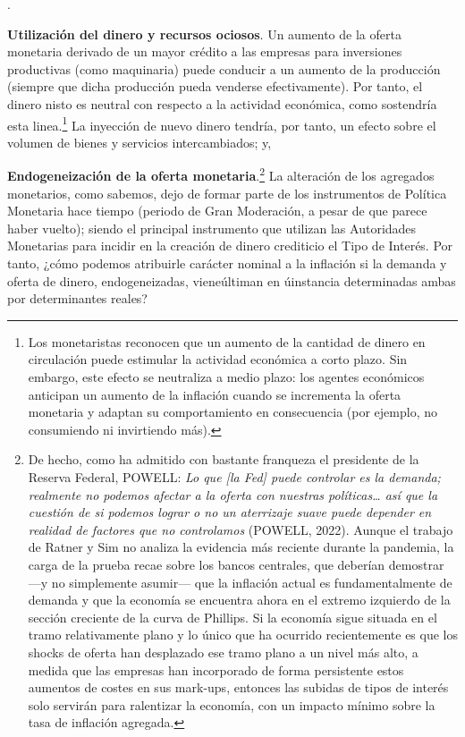 \documentclass[10pt,a4paper]{article}
\newcounter{numitem}
\newenvironment{lnum}
      {\begin{list}{\arabic{numitem}.}{%
          \usecounter{numitem}%
          \setlength{\leftmargin}{1cm}%
          \setlength{\parskip}{3pt}%
          \setlength{\itemsep}{0pt}%
          \setlength{\parsep}{0pt}%
      }}
      {\end{list}}
\begin{document}
\begin{lnum}
    \item \textbf{Utilización del dinero y recursos ociosos}. Un aumento de la oferta monetaria derivado de un mayor crédito a las empresas para inversiones productivas (como maquinaria) puede conducir a un aumento de la producción (siempre que dicha producción pueda venderse efectivamente). Por tanto, el dinero nisto es neutral con respecto a la actividad económica, como sostendría esta linea.\footnote{%
        Los monetaristas reconocen que un aumento de la cantidad de dinero en circulación puede estimular la actividad económica a corto plazo. Sin embargo, este efecto se neutraliza a medio plazo: los agentes económicos anticipan un aumento de la inflación cuando se incrementa la oferta monetaria y adaptan su comportamiento en consecuencia (por ejemplo, no consumiendo ni invirtiendo más).
    } La inyección de nuevo dinero tendría, por tanto, un efecto sobre el volumen de bienes y servicios intercambiados; y,
    \item \textbf{Endogeneización de la oferta monetaria}.\footnote{
    De hecho, como ha admitido con bastante franqueza el presidente de la Reserva Federal, POWELL: \textit{Lo que [la Fed] puede controlar es la demanda; realmente no podemos afectar a la oferta con nuestras políticas… así que la cuestión de si podemos lograr o no un aterrizaje suave puede depender en realidad de factores que no controlamos} (POWELL, 2022). Aunque el trabajo de Ratner y Sim no analiza la evidencia más reciente durante la pandemia, la carga de la prueba recae sobre los bancos centrales, que deberían demostrar —y no simplemente asumir— que la inflación actual es fundamentalmente de demanda y que la economía se encuentra ahora en el extremo izquierdo de la sección creciente de la curva de Phillips. Si la economía sigue situada en el tramo relativamente plano y lo único que ha ocurrido recientemente es que los shocks de oferta han desplazado ese tramo plano a un nivel más alto, a medida que las empresas han incorporado de forma persistente estos aumentos de costes en sus mark-ups, entonces las subidas de tipos de interés solo servirán para ralentizar la economía, con un impacto mínimo sobre la tasa de inflación agregada.
    } La alteración de los agregados monetarios, como sabemos, dejo de formar parte de los instrumentos de Política Monetaria hace tiempo (periodo de Gran Moderación, a pesar de que parece haber vuelto); siendo el principal instrumento que utilizan las Autoridades Monetarias para incidir en la creación de dinero crediticio el Tipo de Interés. Por tanto, ¿cómo podemos atribuirle carácter nominal a la inflación si la demanda y oferta de dinero, endogeneizadas, vieneúltiman en  úinstancia determinadas ambas por determinantes reales?
\end{lnum}
\end{document}
